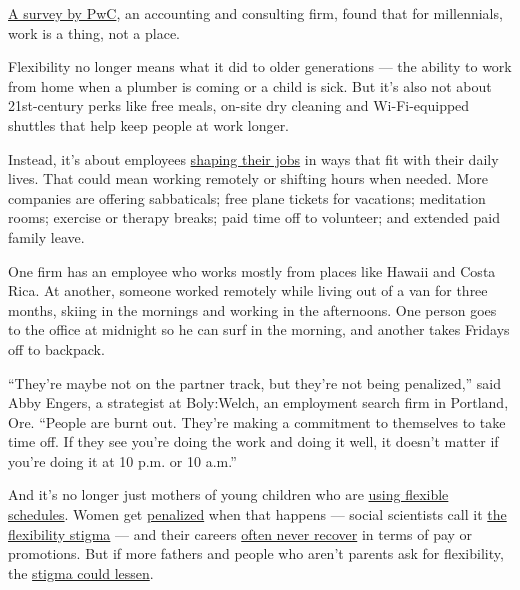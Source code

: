 \href{https://www.pwc.com/gx/en/hr-management-services/publications/assets/pwc-nextgen.pdf}{A
survey by PwC}, an accounting and consulting firm, found that for
millennials, work is a thing, not a place.

Flexibility no longer means what it did to older generations --- the
ability to work from home when a plumber is coming or a child is sick.
But it's also not about 21st-century perks like free meals, on-site dry
cleaning and Wi-Fi-equipped shuttles that help keep people at work
longer.

Instead, it's about employees
\href{https://www.sciencedirect.com/science/article/pii/S000187911930079X?via\%3Dihub\&_ga=2.20924735.68249205.1567371007-1130687845.1567371007}{shaping
their jobs} in ways that fit with their daily lives. That could mean
working remotely or shifting hours when needed. More companies are
offering sabbaticals; free plane tickets for vacations; meditation
rooms; exercise or therapy breaks; paid time off to volunteer; and
extended paid family leave.

One firm has an employee who works mostly from places like Hawaii and
Costa Rica. At another, someone worked remotely while living out of a
van for three months, skiing in the mornings and working in the
afternoons. One person goes to the office at midnight so he can surf in
the morning, and another takes Fridays off to backpack.

``They're maybe not on the partner track, but they're not being
penalized,'' said Abby Engers, a strategist at Boly:Welch, an employment
search firm in Portland, Ore. ``People are burnt out. They're making a
commitment to themselves to take time off. If they see you're doing the
work and doing it well, it doesn't matter if you're doing it at 10 p.m.
or 10 a.m.''

And it's no longer just mothers of young children who are
\href{https://onlinelibrary.wiley.com/doi/10.1111/soc4.12700}{using
flexible schedules}. Women get
\href{https://www.nytimes3xbfgragh.onion/2014/09/07/upshot/a-child-helps-your-career-if-youre-a-man.html}{penalized}
when that happens --- social scientists call it
\href{https://spssi.onlinelibrary.wiley.com/toc/15404560/69/2}{the
flexibility stigma} --- and their careers
\href{https://www.nytimes3xbfgragh.onion/2018/04/09/upshot/the-10-year-baby-window-that-is-the-key-to-the-womens-pay-gap.html}{often
never recover} in terms of pay or promotions. But if more fathers and
people who aren't parents ask for flexibility, the
\href{https://journals.sagepub.com/doi/full/10.1177/0731121418768235}{stigma
could lessen}.

